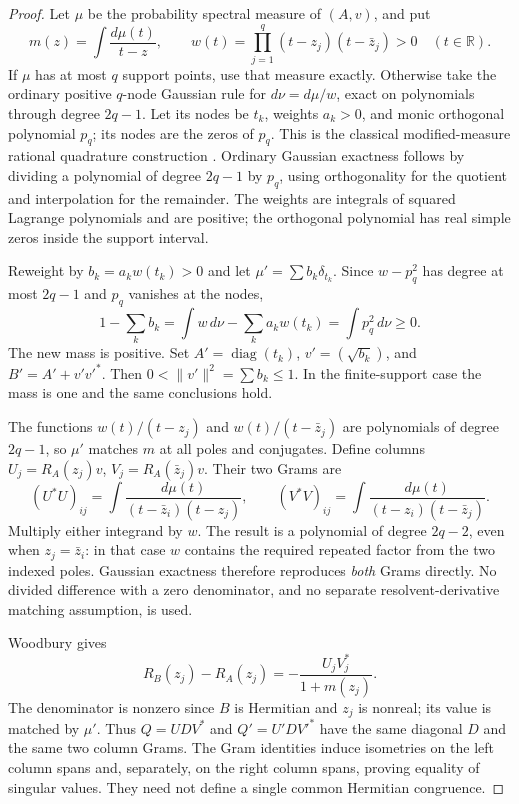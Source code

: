 \documentclass[11pt]{article}
\numberwithin{equation}{section}
\newcommand{\R}{\mathbb R}
\newcommand{\diag}{\operatorname{diag}}
\begin{document}
\begin{proof}
Let $\mu$ be the probability spectral measure of $(A,v)$, and put
\[
 m(z)=\int\frac{d\mu(t)}{t-z},\qquad
 w(t)=\prod_{j=1}^q(t-z_j)(t-\bar z_j)>0\quad(t\in\R).
\]
If $\mu$ has at most $q$ support points, use that measure exactly.
Otherwise take the ordinary positive $q$-node Gaussian rule for
$d\nu=d\mu/w$, exact on polynomials through degree $2q-1$.
Let its nodes be $t_k$, weights $a_k>0$, and monic orthogonal
polynomial $p_q$; its nodes are the zeros of $p_q$.
This is the classical modified-measure rational quadrature construction
\cite[Theorem 3.1 and Section 6(ii)]{Gautschi}.
Ordinary Gaussian exactness follows by dividing a polynomial of degree
$2q-1$ by $p_q$, using orthogonality for the quotient and interpolation
for the remainder. The weights are integrals of squared Lagrange
polynomials and are positive; the orthogonal polynomial has real
simple zeros inside the support interval.

Reweight by $b_k=a_kw(t_k)>0$ and let
$\mu'=\sum b_k\delta_{t_k}$. Since $w-p_q^2$ has degree at most
$2q-1$ and $p_q$ vanishes at the nodes,
\begin{equation}\label{eq:massdefect}
 1-\sum_k b_k=\int w\,d\nu-\sum_k a_kw(t_k)
                =\int p_q^2\,d\nu\ge0.
\end{equation}
The new mass is positive. Set $A'=\diag(t_k)$,
$v'=(\sqrt{b_k})$, and $B'=A'+v'v'^*$. Then
$0<\|v'\|^2=\sum b_k\le1$. In the finite-support case the mass is
one and the same conclusions hold.

The functions $w(t)/(t-z_j)$ and $w(t)/(t-\bar z_j)$ are polynomials
of degree $2q-1$, so $\mu'$ matches $m$ at all poles and conjugates.
Define columns $U_j=R_A(z_j)v$, $V_j=R_A(\bar z_j)v$. Their two
Grams are
\begin{equation}\label{eq:directGrams}
 (U^*U)_{ij}=\int\frac{d\mu(t)}{(t-\bar z_i)(t-z_j)},\qquad
 (V^*V)_{ij}=\int\frac{d\mu(t)}{(t-z_i)(t-\bar z_j)}.
\end{equation}
Multiply either integrand by $w$. The result is a polynomial of
degree $2q-2$, even when $z_j=\bar z_i$: in that case $w$ contains
the required repeated factor from the two indexed poles. Gaussian
exactness therefore reproduces \emph{both} Grams directly. No divided
difference with a zero denominator, and no separate resolvent-derivative
matching assumption, is used.

Woodbury gives
\begin{equation}\label{eq:Woodone}
 R_B(z_j)-R_A(z_j)=-\frac{U_jV_j^*}{1+m(z_j)}.
\end{equation}
The denominator is nonzero since $B$ is Hermitian and $z_j$ is nonreal;
its value is matched by $\mu'$. Thus $Q=UDV^*$ and $Q'=U'DV'^*$
have the same diagonal $D$ and the same two column Grams.
The Gram identities induce isometries on the left column spans and,
separately, on the right column spans, proving equality of singular
values. They need not define a single common Hermitian congruence.
\end{proof}
\end{document}
